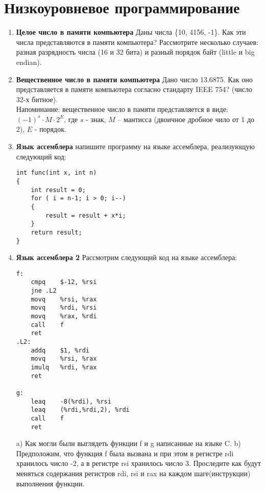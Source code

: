 \documentclass[12pt]{article}
\begin{document}

\section*{Низкоуровневое программирование}

\begin{enumerate}
\item \textbf{Целое число в памяти компьютера} Даны числа \{10, 4156, -1\}. Как эти числа представляются в памяти компьютера? Рассмотрите несколько случаев: разная разрядность числа (16 и 32 бита) и разный порядок байт (little и big endian).
\item \textbf{Вещественное число в памяти компьютера} Дано число 13.6875. Как оно представляется в памяти компьютера согласно стандарту IEEE 754? (число 32-х битное).\\
Напоминание: вещественное число в памяти представляется в виде: $(-1)^s \cdot M \cdot 2^{E}$, где $s$ - знак, $M$ -- мантисса (двоичное дробное чило от 1 до 2), $E$ - порядок.
\item \textbf{Язык ассемблера} напишите программу на языке ассемблера, реализующую следующий код:
\begin{verbatim}
int func(int x, int n)
{
    int result = 0;
    for ( i = n-1; i > 0; i--)
    {
        result = result + x*i;
    }
    return result;
}
\end{verbatim}
\item \textbf{Язык ассемблера 2} Рассмотрим следующий код на языке ассемблера:
\begin{verbatim}
f:
    cmpq	$-12, %rsi
    jne	.L2
    movq	%rsi, %rax
    movq	%rdi, %rsi
    movq	%rax, %rdi
    call	f
    ret
.L2:
    addq    $1, %rdi
    movq	%rsi, %rax
    imulq	%rdi, %rax
    ret

g:
    leaq	-8(%rdi), %rsi
    leaq	(%rdi,%rdi,2), %rdi
    call	f
    ret
\end{verbatim}
 a) Как могли были выглядеть функции f и g написанные на языке C. \newline
 b) Предположим, что функция f была вызвана и при этом в регистре rdi хранилось число -2, а в регистре rsi хранилось число 3. Проследите как будут меняться содержания регистров rdi, rsi и rax на каждом шаге(инструкции) выполнения функции.

\end{enumerate}
\end{document}

